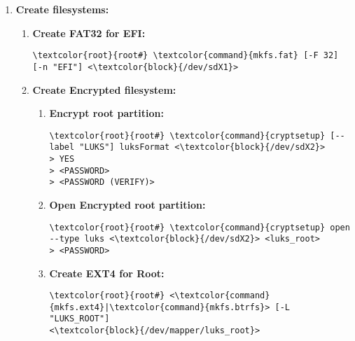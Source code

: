 \documentclass[10pt, a4paper, onecolumn, openany]{book} %
\begin{document}
\begin{enumerate}
    \item \textbf{Create filesystems:}
    \begin{enumerate}
        \item \textbf{Create FAT32 for EFI:}
\begin{Verbatim}[commandchars=\\\{\}]
\textcolor{root}{root#} \textcolor{command}{mkfs.fat} [-F 32] [-n "EFI"] <\textcolor{block}{/dev/sdX1}>
\end{Verbatim}

        \item \textbf{Create Encrypted filesystem:}
        \begin{enumerate}
            \item \textbf{Encrypt root partition:}
\begin{Verbatim}[commandchars=\\\{\}]
\textcolor{root}{root#} \textcolor{command}{cryptsetup} [--label "LUKS"] luksFormat <\textcolor{block}{/dev/sdX2}>
> YES
> <PASSWORD>
> <PASSWORD (VERIFY)>
\end{Verbatim}
            \item \textbf{Open Encrypted root partition:}
\begin{Verbatim}[commandchars=\\\{\}]
\textcolor{root}{root#} \textcolor{command}{cryptsetup} open --type luks <\textcolor{block}{/dev/sdX2}> <luks_root>
> <PASSWORD>
\end{Verbatim}
        \item \textbf{Create EXT4 for Root:}
\begin{Verbatim}[commandchars=\\\{\}]
\textcolor{root}{root#} <\textcolor{command}{mkfs.ext4}|\textcolor{command}{mkfs.btrfs}> [-L "LUKS_ROOT"] 
<\textcolor{block}{/dev/mapper/luks_root}>
\end{Verbatim}      
        \end{enumerate}
    \end{enumerate}


\end{enumerate}
\end{document}
